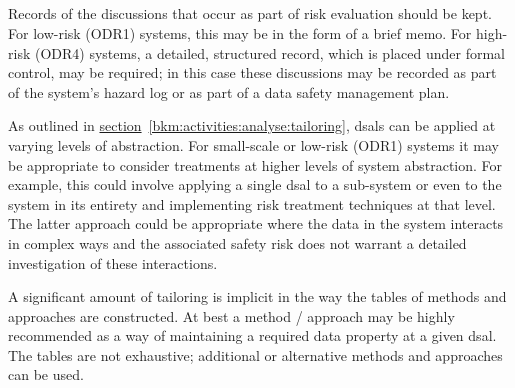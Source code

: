 \subsection{}
Records of the discussions that occur as part of risk evaluation should be kept. For low-risk (ODR1) systems, this may be in the form of a brief memo. For high-risk (ODR4) systems, a detailed, structured record, which is placed under formal control, may be required; in this case these discussions may be recorded as part of the system's \gls{hazard log} or as part of a data safety management plan.

As outlined in
\hyperref[bkm:activities:analyse:tailoring]{section}~\ref{bkm:activities:analyse:tailoring}, %
\glspl{dsal} can be applied at varying levels of abstraction. For small-scale or low-risk (ODR1) systems it may be appropriate to consider \glspl{treatment} at higher levels of system abstraction. For example, this could involve applying a single \gls{dsal} to a sub-system or even to the system in its entirety and implementing risk \gls{treatment} techniques at that level. The latter approach could be appropriate where the data in the system interacts in complex ways and the associated safety risk does not warrant a detailed investigation of these interactions.

A significant amount of \gls{tailoring} is implicit in the way the tables of methods and approaches are constructed. At best a method / approach may be highly recommended as a way of maintaining a required data property at a given \gls{dsal}. The tables are not exhaustive; additional or alternative methods and approaches can be used.
